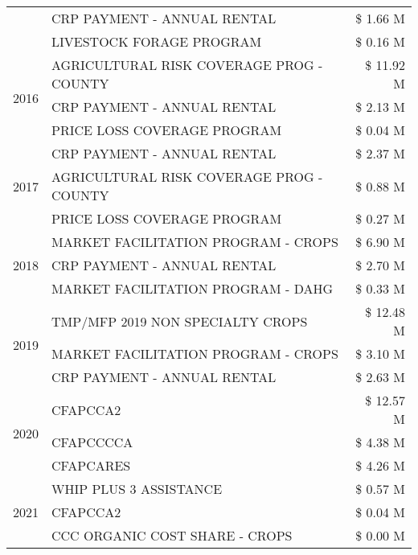 \begin{tabular}{llr}
 & CRP PAYMENT - ANNUAL RENTAL & \$ 1.66 M \\
 & LIVESTOCK FORAGE PROGRAM & \$ 0.16 M \\
\cline{1-3}
\multirow[t]{3}{*}{2016} & AGRICULTURAL RISK COVERAGE PROG - COUNTY & \$ 11.92 M \\
 & CRP PAYMENT - ANNUAL RENTAL & \$ 2.13 M \\
 & PRICE LOSS COVERAGE PROGRAM & \$ 0.04 M \\
\cline{1-3}
\multirow[t]{3}{*}{2017} & CRP PAYMENT - ANNUAL RENTAL & \$ 2.37 M \\
 & AGRICULTURAL RISK COVERAGE PROG - COUNTY & \$ 0.88 M \\
 & PRICE LOSS COVERAGE PROGRAM & \$ 0.27 M \\
\cline{1-3}
\multirow[t]{3}{*}{2018} & MARKET FACILITATION PROGRAM - CROPS & \$ 6.90 M \\
 & CRP PAYMENT - ANNUAL RENTAL & \$ 2.70 M \\
 & MARKET FACILITATION PROGRAM - DAHG & \$ 0.33 M \\
\cline{1-3}
\multirow[t]{3}{*}{2019} & TMP/MFP 2019 NON SPECIALTY CROPS & \$ 12.48 M \\
 & MARKET FACILITATION PROGRAM - CROPS & \$ 3.10 M \\
 & CRP PAYMENT - ANNUAL RENTAL & \$ 2.63 M \\
\cline{1-3}
\multirow[t]{3}{*}{2020} & CFAPCCA2 & \$ 12.57 M \\
 & CFAPCCCCA & \$ 4.38 M \\
 & CFAPCARES & \$ 4.26 M \\
\cline{1-3}
\multirow[t]{3}{*}{2021} & WHIP PLUS 3 ASSISTANCE & \$ 0.57 M \\
 & CFAPCCA2 & \$ 0.04 M \\
 & CCC ORGANIC COST SHARE - CROPS & \$ 0.00 M \\
\cline{1-3}
\bottomrule
\end{tabular}
